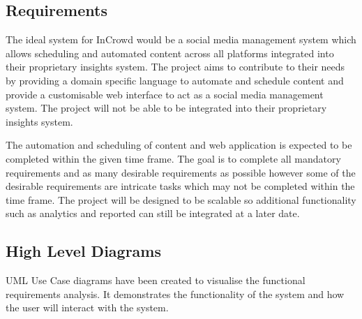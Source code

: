 \documentclass[chapterprefix=false]{scrreprt}
\begin{document}
\subsection{Requirements}

The ideal system for InCrowd would be a social media management system which allows scheduling and automated content across all platforms integrated into their proprietary insights system. The project aims to contribute to their needs by providing a domain specific language to automate and schedule content and provide a customisable web interface to act as a social media management system. The project will not be able to be integrated into their proprietary insights system.

The automation and scheduling of content and web application is expected to be completed within the given time frame. The goal is to complete all mandatory requirements and as many desirable requirements as possible however some of the desirable requirements are intricate tasks which may not be completed within the time frame. The project will be designed to be scalable so additional functionality such as analytics and reported can still be integrated at a later date.

\subsection{High Level Diagrams}

UML Use Case diagrams have been created to visualise the functional requirements analysis. It demonstrates the functionality of the system and how the user will interact with the system.

\newpage
\null
\vfill
\end{document}
